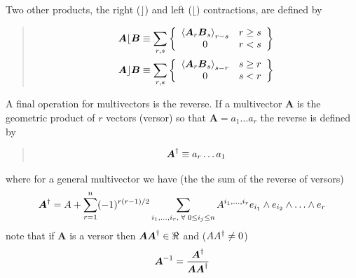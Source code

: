 \documentclass[letterpaper,10pt,english]{sphinxmanual}
\begin{document}
Two other products, the right ($\rfloor$) and left ($\lfloor$) contractions, are defined by
\begin{quote}
\begin{gather}
\begin{split}\begin{align*}
   \boldsymbol{A}\lfloor\boldsymbol{B} &\equiv \sum_{r,s}\left \{ {\begin{array}{cc} \left < {\boldsymbol{A}_r\boldsymbol{B}_{s}} \right >_{r-s} & r \ge s \\
                                               0                                               & r < s \end{array}} \right \}  \\
   \boldsymbol{A}\rfloor\boldsymbol{B} &\equiv \sum_{r,s}\left \{ {\begin{array}{cc} \left < {\boldsymbol{A}_{r}\boldsymbol{B}_{s}} \right >_{s-r} & s \ge r \\
                                               0                                               & s < r\end{array}} \right \}
\end{align*}\end{split}\notag
\end{gather}\end{quote}

A final operation for multivectors is the reverse.  If a multivector $\bm{A}$ is the geometric product of $r$ vectors (versor)
so that $\bm{A} = a_{1}\dots a_{r}$ the reverse is defined by
\begin{quote}
\begin{gather}
\begin{split}\begin{align*}
   \boldsymbol{A}^{\dagger} \equiv a_{r}\dots a_{1}
\end{align*}\end{split}\notag
\end{gather}\end{quote}

where for a general multivector we have (the the sum of the reverse of versors)
\begin{gather}
\begin{split}\begin{equation*}
   \bm{A}^{\R} = A + \sum_{r=1}^{n}(-1)^{r(r-1)/2}\sum_{i_{1},\dots,i_{r},\;\forall\; 0\le i_{j} \le n} A^{i_{1},\dots,i_{r}}e_{i_{1}}\W e_{i_{2}}\W\dots\W e_{r}
\end{equation*}\end{split}\notag
\end{gather}
note that if $\bm{A}$ is a versor then $\boldsymbol{A}\boldsymbol{A}^{\dagger}\in\Re$ and ($AA^{\dagger} \ne 0$)
\begin{gather}
\begin{split}\begin{equation*}
   \boldsymbol{A}^{-1} = \displaystyle\frac{\boldsymbol{A}^{\dagger}}{\boldsymbol{AA}^{\dagger}}
\end{equation*}\end{split}\notag
\end{gather}
\end{document}
